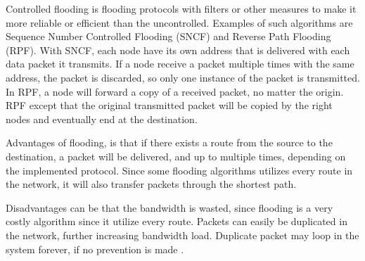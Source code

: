 Controlled flooding is flooding protocols with filters or other measures to make it more reliable or efficient than the uncontrolled.
Examples of such algorithms are Sequence Number Controlled Flooding (SNCF) and Reverse Path Flooding (RPF).
With SNCF, each node have its own address that is delivered with each data packet it transmits.
If a node receive a packet multiple times with the same address, the packet is discarded, so only one instance of the packet is transmitted.
In RPF, a node will forward a copy of a received packet, no matter the origin.
RPF except that the original transmitted packet will be copied by the right nodes and eventually end at the destination\cite{RPF}.

Advantages of flooding, is that if there exists a route from the source to the destination, a packet will be delivered, and up to multiple times, depending on the implemented protocol.
Since some flooding algorithms utilizes every route in the network, it will also transfer packets through the shortest path\cite{flooding}.

Disadvantages can be that the bandwidth is wasted, since flooding is a very costly algorithm since it utilize every route.
Packets can easily be duplicated in the network, further increasing bandwidth load.
Duplicate packet may loop in the system forever, if no prevention is made \cite{flooding}.
